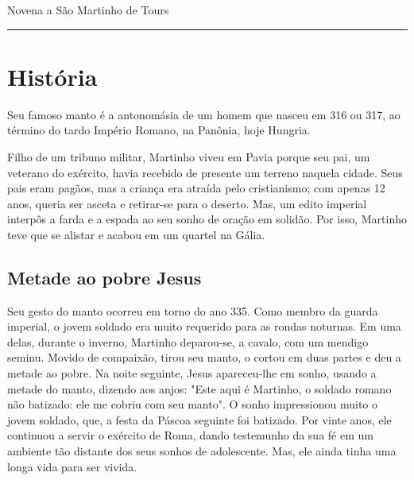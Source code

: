 \documentclass[a4paper,14pt,twoside]{extarticle} \usepackage[utf8]{inputenc}
\begin{document}
\begin{center}
  {\huge Novena a São Martinho de Tours}
\end{center}




\begin{center}
  \rule{1.0\textwidth}{0.4pt}
\end{center}

\tableofcontents
\thispagestyle{empty}


\newpage
\section{História}

Seu famoso manto é a antonomásia de um homem que nasceu em 316 ou 317, ao término do tardo Império Romano, na Panônia, hoje Hungria.

Filho de um tribuno militar, Martinho viveu em Pavia porque seu pai, um veterano do exército, havia recebido de presente um terreno naquela cidade.
Seus pais eram pagãos, mas a criança era atraída pelo cristianismo; com apenas 12 anos, queria ser asceta e retirar-se para o deserto. Mas, um edito imperial interpôs a farda e a espada ao seu sonho de oração em solidão. Por isso, Martinho teve que se alistar e acabou em um quartel na Gália.

\subsection{Metade ao pobre Jesus}

Seu gesto do manto ocorreu em torno do ano 335. Como membro da guarda imperial, o jovem soldado era muito requerido para as rondas noturnas. Em uma delas, durante o inverno, Martinho deparou-se, a cavalo, com um mendigo seminu. Movido de compaixão, tirou seu manto, o cortou em duas partes e deu a metade ao pobre. Na noite seguinte, Jesus apareceu-lhe em sonho, usando a metade do manto, dizendo aos anjos: "Este aqui é Martinho, o soldado romano não batizado: ele me cobriu com seu manto". O sonho impressionou muito o jovem soldado, que, a festa da Páscoa seguinte foi batizado.
Por vinte anos, ele continuou a servir o exército de Roma, dando testemunho da sua fé em um ambiente tão distante dos seus sonhos de adolescente. Mas, ele ainda tinha uma longa vida para ser vivida.
\end{document}
